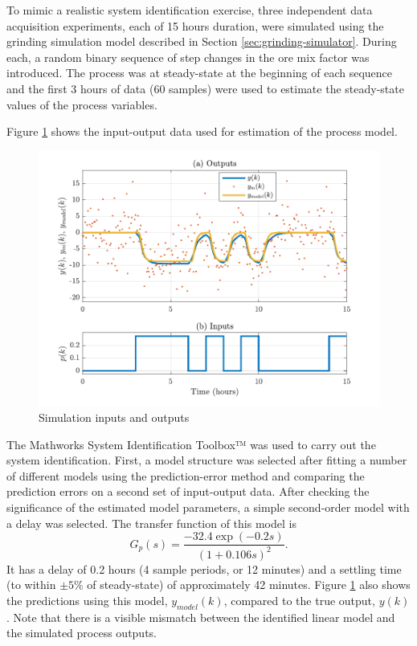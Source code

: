 To mimic a realistic system identification exercise, three independent data acquisition experiments, each of 15 hours duration, were simulated using the grinding simulation model described in Section \ref{sec:grinding-simulator}. During each, a random binary sequence of step changes in the ore mix factor was introduced. The process was at steady-state at the beginning of each sequence and the first 3 hours of data (60 samples) were used to estimate the steady-state values of the process variables.

Figure \ref{fig:grind1-sim_ioplots} shows the input-output data used for estimation of the process model.
\begin{figure}[htp]
	\centering
	\includegraphics[width=13cm]{images/grind1_ioplot_P2DcTd4.pdf}
	\caption{Simulation inputs and outputs}
	\label{fig:grind1-sim_ioplots}
\end{figure}

The Mathworks System Identification Toolbox™ was used to carry out the system identification. First, a model structure was selected after fitting a number of different models using the prediction-error method and comparing the prediction errors on a second set of input-output data. After checking the significance of the estimated model parameters, a simple second-order model with a delay was selected. The transfer function of this model is
\begin{equation} \label{eq:grind1-id-model-ctf}
	G_p(s)= \frac{-32.4\exp(-0.2s)}{(1 + 0.106s)^2}.
\end{equation}
It has a delay of 0.2 hours (4 sample periods, or 12 minutes) and a settling time (to within $\pm5\%$ of steady-state) of approximately 42 minutes. Figure \ref{fig:grind1-sim_ioplots} also shows the predictions using this model, $y_{model}(k)$, compared to the true output, $y(k)$. Note that there is a visible mismatch between the identified linear model and the simulated process outputs.

